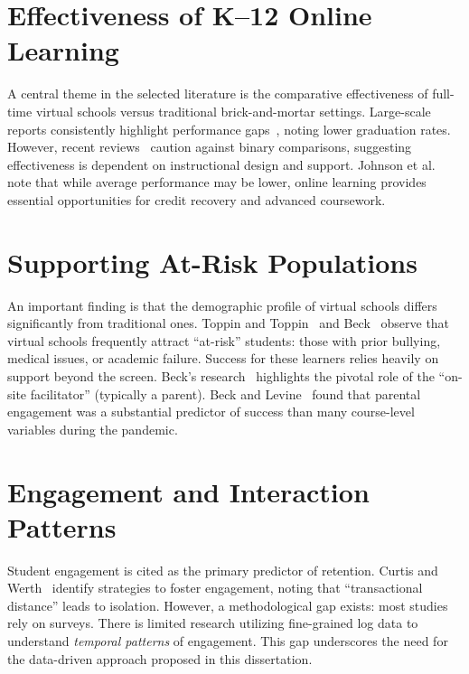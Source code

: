 \section{Effectiveness of K--12 Online Learning}
\label{sec:effectiveness}
A central theme in the selected literature is the comparative effectiveness of full-time virtual schools versus traditional brick-and-mortar settings.
Large-scale reports consistently highlight performance gaps~\cite{molnar_virtual_2023}, noting lower graduation rates.
However, recent reviews~\cite{martin_systematic_2020, online_johnson_2022} caution against binary comparisons, suggesting effectiveness is dependent on instructional design and support.
Johnson et al.~\cite{online_johnson_2022} note that while average performance may be lower, online learning provides essential opportunities for credit recovery and advanced coursework.

\section{Supporting At-Risk Populations}
\label{sec:at-risk}
An important finding is that the demographic profile of virtual schools differs significantly from traditional ones.
Toppin and Toppin~\cite{virtual_toppin_2016} and Beck~\cite{beck_prepared_2023} observe that virtual schools frequently attract ``at-risk'' students: those with prior bullying, medical issues, or academic failure.
Success for these learners relies heavily on support beyond the screen.
Beck's research~\cite{beck_advocate_2020, beck_atrisk_2024} highlights the pivotal role of the ``on-site facilitator'' (typically a parent).
Beck and Levine~\cite{beck_advocate_2020} found that parental engagement was a substantial predictor of success than many course-level variables during the pandemic.

\section{Engagement and Interaction Patterns}
\label{sec:engagement}
Student engagement is cited as the primary predictor of retention.
Curtis and Werth~\cite{fostering_curtis_2015} identify strategies to foster engagement, noting that ``transactional distance'' leads to isolation.
However, a methodological gap exists: most studies rely on surveys.
There is limited research utilizing fine-grained log data to understand \textit{temporal patterns} of engagement.
This gap underscores the need for the data-driven approach proposed in this dissertation.

